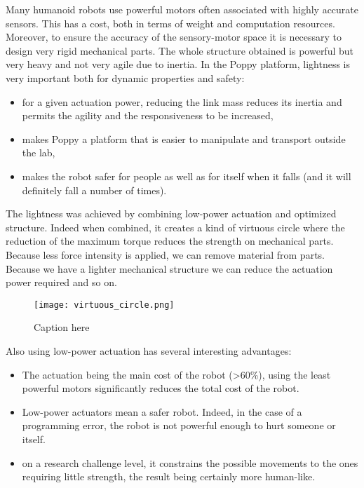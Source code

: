 Many humanoid robots use powerful motors often associated with highly accurate sensors. This has a cost, both in terms of weight and computation resources. Moreover, to ensure the accuracy of the sensory-motor space it is necessary to design very rigid mechanical parts. The whole structure obtained is powerful but very heavy and not very agile due to inertia.
In the Poppy platform, lightness is very important both for dynamic properties and safety:
\begin{itemize}
    \item for a given actuation power, reducing the link mass reduces its inertia and permits the agility and the responsiveness to be increased,
    \item makes Poppy a platform that is easier to manipulate and transport outside the lab,
    \item makes the robot safer for people as well as for itself when it falls (and it will definitely fall a number of times).
\end{itemize}

The lightness was achieved by combining low-power actuation and optimized structure. Indeed when combined, it creates a kind of virtuous circle where the reduction of the maximum torque reduces the strength on mechanical parts. Because less force intensity is applied, we can remove material from parts. Because we have a lighter mechanical structure we can reduce the actuation power required and so on.

\begin{figure}[tb]
    \begin{center}
        \texttt{[image: virtuous\_circle.png]}
    \end{center}
    \caption{Caption here}
    \label{fig:figure1}
\end{figure}

Also using low-power actuation has several interesting advantages:

\begin{itemize}
    \item The actuation being the main cost of the robot (>60\%), using the least powerful motors significantly reduces the total cost of the robot.
    \item Low-power actuators mean a safer robot. Indeed, in the case of a programming error, the robot is not powerful enough to hurt someone or itself.
    \item on a research challenge level, it constrains the possible movements to the ones requiring little strength, the result being certainly more human-like.
\end{itemize}

